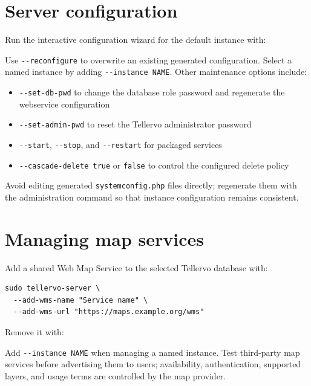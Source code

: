 \section{Server configuration}
\label{txt:serverConfig}

Run the interactive configuration wizard for the default instance with:


Use \verb|--reconfigure| to overwrite an existing generated configuration.
Select a named instance by adding \verb|--instance NAME|. Other maintenance
options include:

\begin{itemize}
 \item \verb|--set-db-pwd| to change the database role password and regenerate
 the webservice configuration
 \item \verb|--set-admin-pwd| to reset the Tellervo administrator password
 \item \verb|--start|, \verb|--stop|, and \verb|--restart| for packaged services
 \item \verb|--cascade-delete true| or \verb|false| to control the configured
 delete policy
\end{itemize}

Avoid editing generated \verb|systemconfig.php| files directly; regenerate them
with the administration command so that instance configuration remains
consistent.

\section{Managing map services}
\label{txt:managingmaps}

Add a shared Web Map Service to the selected Tellervo database with:

\begin{lstlisting}
sudo tellervo-server \
  --add-wms-name "Service name" \
  --add-wms-url "https://maps.example.org/wms"
\end{lstlisting}

Remove it with:


Add \verb|--instance NAME| when managing a named instance. Test third-party map
services before advertising them to users; availability, authentication,
supported layers, and usage terms are controlled by the map provider.
